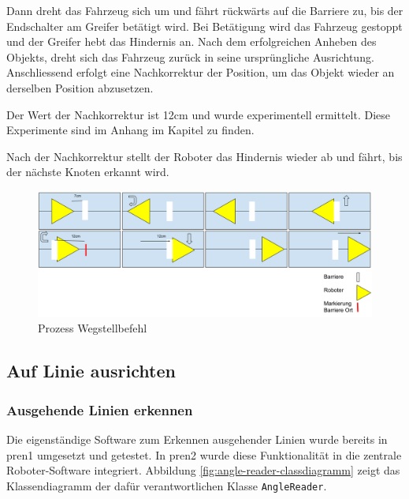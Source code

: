 Dann dreht das Fahrzeug sich um und fährt rückwärts auf die Barriere zu, bis der Endschalter am Greifer betätigt wird. Bei Betätigung wird das Fahrzeug gestoppt und der Greifer hebt das Hindernis an.
Nach dem erfolgreichen Anheben des Objekts, dreht sich das Fahrzeug zurück in seine ursprüngliche Ausrichtung. Anschliessend erfolgt eine Nachkorrektur der Position, um das Objekt wieder an derselben Position abzusetzen.

Der Wert der Nachkorrektur ist 12cm und wurde experimentell ermittelt. Diese Experimente sind im Anhang im Kapitel  zu finden.

Nach der Nachkorrektur stellt der Roboter das Hindernis wieder ab und fährt, bis der nächste Knoten erkannt wird.

\begin{figure}[H]
    \centering
    \includegraphics[width=\linewidth]{assets/ET/wegstellbefehl.png}
    \caption{Prozess Wegstellbefehl}
    \label{fig:wegstellbefehl}
\end{figure}


\newpage
\subsection{Auf Linie ausrichten}



\subsubsection{Ausgehende Linien erkennen}
\label{outgoing-lines}

Die eigenständige Software zum Erkennen ausgehender Linien wurde bereits in \acrshort{pren1} umgesetzt und getestet. In \acrshort{pren2} wurde diese Funktionalität in die zentrale Roboter-Software integriert. Abbildung \ref{fig:angle-reader-classdiagramm} zeigt das Klassendiagramm der dafür verantwortlichen Klasse \verb|AngleReader|.

